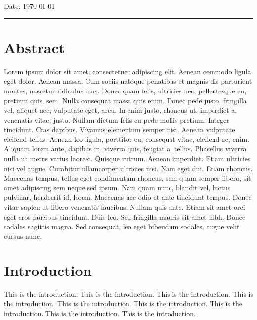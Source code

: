 \documentclass[a4paper,11pt]{report}
\begin{document}
\noindent Date: \today \\[1mm]
\rule[1em]{25em}{0.5pt}



\chapter*{\Large \center Abstract}
Lorem ipsum dolor sit amet, consectetuer adipiscing elit. Aenean commodo ligula eget dolor. Aenean massa. Cum sociis natoque penatibus et magnis dis parturient montes, nascetur ridiculus mus. Donec quam felis, ultricies nec, pellentesque eu, pretium quis, sem. Nulla consequat massa quis enim. Donec pede justo, fringilla vel, aliquet nec, vulputate eget, arcu. In enim justo, rhoncus ut, imperdiet a, venenatis vitae, justo. Nullam dictum felis eu pede mollis pretium. Integer tincidunt. Cras dapibus. Vivamus elementum semper nisi. Aenean vulputate eleifend tellus. Aenean leo ligula, porttitor eu, consequat vitae, eleifend ac, enim. Aliquam lorem ante, dapibus in, viverra quis, feugiat a, tellus. Phasellus viverra nulla ut metus varius laoreet. Quisque rutrum. Aenean imperdiet. Etiam ultricies nisi vel augue. Curabitur ullamcorper ultricies nisi. Nam eget dui. Etiam rhoncus. Maecenas tempus, tellus eget condimentum rhoncus, sem quam semper libero, sit amet adipiscing sem neque sed ipsum. Nam quam nunc, blandit vel, luctus pulvinar, hendrerit id, lorem. Maecenas nec odio et ante tincidunt tempus. Donec vitae sapien ut libero venenatis faucibus. Nullam quis ante. Etiam sit amet orci eget eros faucibus tincidunt. Duis leo. Sed fringilla mauris sit amet nibh. Donec sodales sagittis magna. Sed consequat, leo eget bibendum sodales, augue velit cursus nunc.



\tableofcontents
\listoffigures
\listoftables
\chapter{Introduction}
\label{sec:org7790bb2}
This is the introduction.\autocite{example_citation}
This is the introduction.
This is the introduction.
This is the introduction.
This is the introduction.
This is the introduction.
This is the introduction.
This is the introduction.
This is the introduction.
\end{document}
